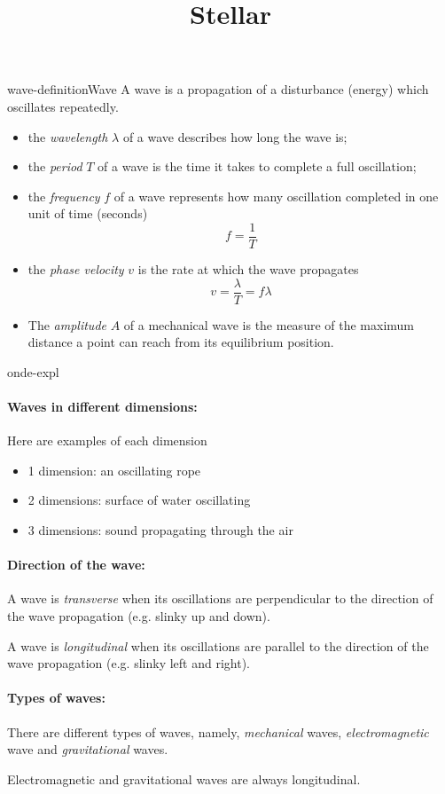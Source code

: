 \documentclass[preview]{standalone}
\begin{document}
\title{Stellar}
\genpage

\begin{snippetdefinition}{wave-definition}{Wave}
    A wave is a propagation of a disturbance (energy) which oscillates
    repeatedly.
    \begin{itemize}
        \item the \textit{wavelength} \(\lambda\) of a wave describes how long the wave is;
        \item the \textit{period} \(T\) of a wave is the time it takes to complete
            a full oscillation;
        \item the \textit{frequency} \(f\) of a wave represents how many oscillation
        completed in one unit of time (seconds)
        \[
            f = \frac{1}{T}
        \]
        \item the \textit{phase velocity} \(v\) is the rate at which
        the wave propagates
        \[
            v = \frac{\lambda}{T} = f\lambda
        \]
        \item The \textit{amplitude} \(A\) of a mechanical wave is the
        measure of the maximum distance a point can reach
        from its equilibrium position.
    \end{itemize} 
\end{snippetdefinition}

\begin{snippet}{onde-expl}
    \vspace{-0.6cm}
    \paragraph{Waves in different dimensions:}
    Here are examples of each dimension
    \begin{itemize}
        \item 1 dimension: an oscillating rope
        \item 2 dimensions: surface of water oscillating
        \item 3 dimensions: sound propagating through the air
    \end{itemize}

    \paragraph{Direction of the wave:}
    A wave is \textit{transverse} when its oscillations are perpendicular
    to the direction of the wave propagation (e.g. slinky up and down).

    A wave is \textit{longitudinal} when its oscillations are parallel
    to the direction of the wave propagation (e.g. slinky left and right).

    \paragraph{Types of waves:}
    There are different types of waves, namely,
    \textit{mechanical} waves, \textit{electromagnetic} wave
    and \textit{gravitational} waves.

    Electromagnetic and gravitational waves are always longitudinal.
\end{snippet}
\end{document}

